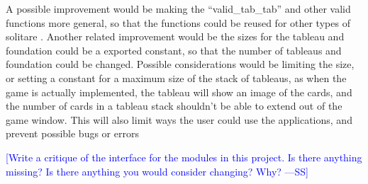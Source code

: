 \documentclass[12pt]{article}
\newcommand{\authornote}[3]{\textcolor{#1}{[#3 ---#2]}}
\newcommand{\authornote}[3]{}
\newcommand{\wss}[1]{\authornote{blue}{SS}{#1}}
\begin{document}
 A possible improvement would be making the ``valid\_tab\_tab'' and other valid functions more general, so that the functions could be reused for other types of solitare . Another related improvement would be the sizes for the tableau and foundation could be a exported constant, so that the number of tableaus and foundation could be changed. Possible considerations would be limiting the size, or setting a constant for a maximum size of the stack of tableaus, as when the game is actually implemented, the tableau will show an image of the cards, and the number of cards in a tableau stack shouldn't be able to extend out of the game window. This will also limit ways the user could use the applications, and prevent possible bugs or errors

\wss{Write a critique of the interface for the modules in this project.  Is there
anything missing?  Is there anything you would consider changing?  Why?}\\
\end{document}
